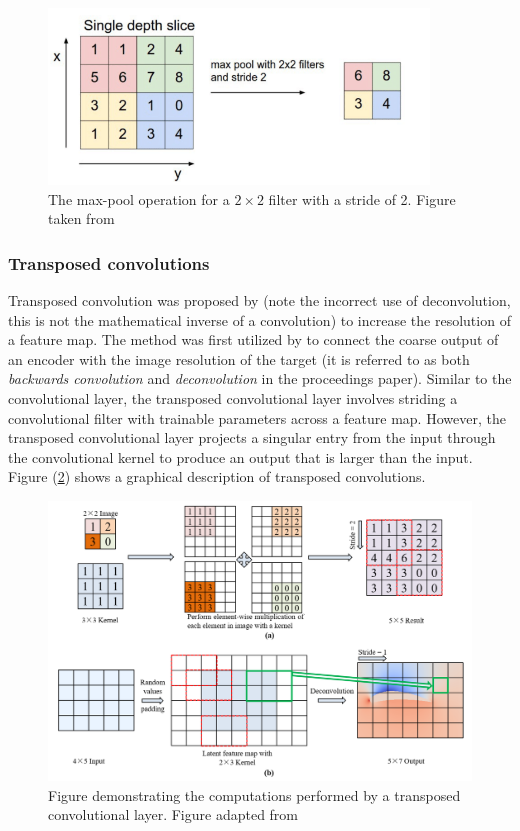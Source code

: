 \documentclass[../main/thesis.tex]{subfiles}
\begin{document}
\begin{figure}
    \centering
    \includegraphics[width=0.9\textwidth]{The-MaxPool-operation}
    \caption{\label{fig:maxpool}The max-pool operation for a $2 \times 2$ filter with a stride of 2. Figure taken from \protect\citet{MihaiDaniel2020}}
\end{figure}

\subsubsection{Transposed convolutions}
\label{sec:tconv}
Transposed convolution was proposed by \citet{Zeiler2010} (note the incorrect use of deconvolution, this is not the mathematical inverse of a convolution) to increase the resolution of a feature map. The method was first utilized by \citet{Long2015} to connect the coarse output of an encoder with the image resolution of the target (it is referred to as both \textit{backwards convolution} and \textit{deconvolution} in the proceedings paper). Similar to the convolutional layer, the transposed convolutional layer involves striding a convolutional filter with trainable parameters across a feature map. However, the transposed convolutional layer projects a singular entry from the input through the convolutional kernel to produce an output that is larger than the input. Figure (\ref{fig:tconv}) shows a graphical description of transposed convolutions.

\begin{figure}
    \centering
    \includegraphics[trim = {0 5.125cm 0 0}, clip, width = \textwidth]{applsci-12-12075-g004}
    \caption{\label{fig:tconv}Figure demonstrating the computations performed by a transposed convolutional layer. Figure adapted from \protect\citet{Wu2022}}
\end{figure}
\end{document}
